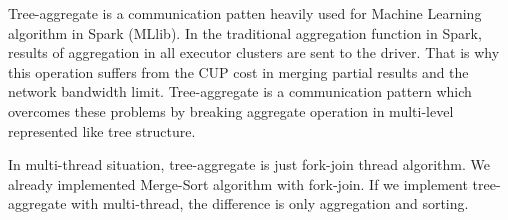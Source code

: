 Tree-aggregate is a communication patten heavily used for Machine Learning algorithm in Spark (MLlib). 
In the traditional aggregation function in Spark, results of aggregation in all executor clusters are sent to the driver. 
That is why this operation suffers from the CUP cost in merging partial results and the network bandwidth limit.
Tree-aggregate is a communication pattern which overcomes these problems by breaking aggregate operation in multi-level represented like tree structure.

In multi-thread situation, tree-aggregate is just fork-join thread algorithm. We already implemented Merge-Sort algorithm with fork-join. 
If we implement tree-aggregate with multi-thread, the difference is only aggregation and sorting.